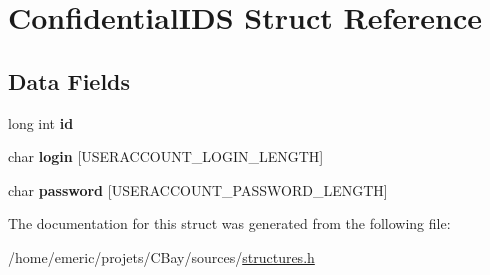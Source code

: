 \hypertarget{struct_confidential_i_d_s}{\section{Confidential\-I\-D\-S Struct Reference}
\label{struct_confidential_i_d_s}
}
\subsection*{Data Fields}
\begin{DoxyCompactItemize}
\item 
\hypertarget{struct_confidential_i_d_s_a53f4656a3ccbae3d40e94f582eef745f}{long int {\bfseries id}}\label{struct_confidential_i_d_s_a53f4656a3ccbae3d40e94f582eef745f}

\item 
\hypertarget{struct_confidential_i_d_s_a4bf7e90f51b7f7d3617117ae6f12c052}{char {\bfseries login} \mbox{[}U\-S\-E\-R\-A\-C\-C\-O\-U\-N\-T\-\_\-\-L\-O\-G\-I\-N\-\_\-\-L\-E\-N\-G\-T\-H\mbox{]}}\label{struct_confidential_i_d_s_a4bf7e90f51b7f7d3617117ae6f12c052}

\item 
\hypertarget{struct_confidential_i_d_s_a79861f2b044c93f50ef5ffe118c1e28d}{char {\bfseries password} \mbox{[}U\-S\-E\-R\-A\-C\-C\-O\-U\-N\-T\-\_\-\-P\-A\-S\-S\-W\-O\-R\-D\-\_\-\-L\-E\-N\-G\-T\-H\mbox{]}}\label{struct_confidential_i_d_s_a79861f2b044c93f50ef5ffe118c1e28d}

\end{DoxyCompactItemize}


The documentation for this struct was generated from the following file\-:\begin{DoxyCompactItemize}
\item 
/home/emeric/projets/\-C\-Bay/sources/\hyperlink{structures_8h}{structures.\-h}\end{DoxyCompactItemize}
